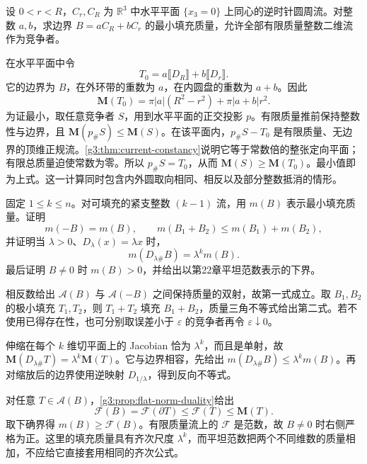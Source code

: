 \BookExercises

\begin{exercise}\label{g3:ex:plateau-concentric-multiplicities}
	设 \(0<r<R\)，\(C_r,C_R\) 为 \(\mathbb R^3\) 中水平平面 \(\{x_3=0\}\) 上同心的逆时针圆周流。对整数 \(a,b\)，求边界 \(B=aC_R+bC_r\) 的最小填充质量，允许全部有限质量整数二维流作为竞争者。
\end{exercise}
\begin{solution}
	在水平平面中令
	\[
		T_0=a\lBrack D_R\rBrack+b\lBrack D_r\rBrack.
	\]
	它的边界为 \(B\)，在外环带的重数为 \(a\)，在内圆盘的重数为 \(a+b\)。因此
	\[
		\mathbf M(T_0)=\pi|a|(R^2-r^2)+\pi|a+b|r^2.
	\]
	为证最小，取任意竞争者 \(S\)，用到水平平面的正交投影 \(p\)。有限质量推前保持整数性与边界，且 \(\mathbf M(p_\#S)\le\mathbf M(S)\)。在该平面内，\(p_\#S-T_0\) 是有限质量、无边界的顶维正规流。\cref{g3:thm:current-constancy}说明它等于常数倍的整张定向平面；有限总质量迫使常数为零。所以 \(p_\#S=T_0\)，从而 \(\mathbf M(S)\ge\mathbf M(T_0)\)。最小值即为上式。这一计算同时包含内外圆取向相同、相反以及部分整数抵消的情形。
\end{solution}

\begin{exercise}\label{g3:ex:plateau-scaling-and-boundary}
	固定 \(1\le k\le n\)。对可填充的紧支整数 \((k-1)\) 流，用 \(m(B)\) 表示最小填充质量。证明
	\[
		m(-B)=m(B),\qquad m(B_1+B_2)\le m(B_1)+m(B_2),
	\]
	并证明当 \(\lambda>0\)、\(D_\lambda(x)=\lambda x\) 时，
	\[
		m(D_{\lambda\#}B)=\lambda^k m(B).
	\]
	最后证明 \(B\ne0\) 时 \(m(B)>0\)，并给出以第22章平坦范数表示的下界。
\end{exercise}
\begin{solution}
	相反数给出 \(\mathcal A(B)\) 与 \(\mathcal A(-B)\) 之间保持质量的双射，故第一式成立。取 \(B_1,B_2\) 的极小填充 \(T_1,T_2\)，则 \(T_1+T_2\) 填充 \(B_1+B_2\)，质量三角不等式给出第二式。若不使用已得存在性，也可分别取误差小于 \(\varepsilon\) 的竞争者再令 \(\varepsilon\downarrow0\)。

	伸缩在每个 \(k\) 维切平面上的 Jacobian 恰为 \(\lambda^k\)，而且是单射，故
	\(\mathbf M(D_{\lambda\#}T)=\lambda^k\mathbf M(T)\)。它与边界相容，先给出
	\(m(D_{\lambda\#}B)\le\lambda^k m(B)\)。再对缩放后的边界使用逆映射 \(D_{1/\lambda}\)，得到反向不等式。

	对任意 \(T\in\mathcal A(B)\)，\cref{g3:prop:flat-norm-duality}给出
	\[
		\mathcal F(B)=\mathcal F(\partial T)
		\le\mathcal F(T)\le\mathbf M(T).
	\]
	取下确界得 \(m(B)\ge\mathcal F(B)\)。有限质量流上的 \(\mathcal F\) 是范数，故 \(B\ne0\) 时右侧严格为正。这里的填充质量具有齐次尺度 \(\lambda^k\)，而平坦范数把两个不同维数的质量相加，不应给它直接套用相同的齐次公式。
\end{solution}

